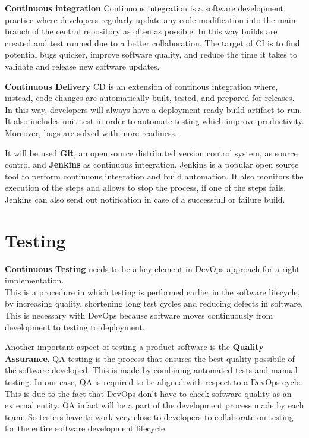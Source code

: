 \textbf{Continuous integration}
Continuous integration is a software development practice where developers regularly update any code modification into the main branch of the central repository as often as possible. In this way builds are created and test runned due to a better collaboration. The target of CI is to find potential bugs quicker, improve software quality, and reduce the time it takes to validate and release new software updates.
\par
\textbf{Continuous Delivery} 
CD is an extension of continous integration where, instead, code changes are automatically built, tested, and prepared for releases. In this way, developers will always have a deployment-ready build artifact to run. It also includes unit test in order to automate testing which improve productivity. Moreover, bugs are solved with more readiness.
\par

It will be used \textbf{Git}, an open source distributed version control system, as source control and \textbf{Jenkins} as continuous integration.
Jenkins is a popular open source tool to perform continuous integration and build automation.
It also monitors the execution of the steps and allows to stop the process, if one of the steps fails. Jenkins can also send out notification in case of a successfull or failure build.

 
\section{Testing}

\textbf{Continuous Testing} needs to be a key element in DevOps approach for a right implementation. \\
This is a procedure in which testing is performed earlier in the software lifecycle, by increasing quality, shortening long test cycles and reducing defects in software.
This is necessary with DevOps because software moves continuously from development to testing to deployment.
\par
Another important aspect of testing a product software is the \textbf{Quality Assurance}.
QA testing is the process that ensures the best quality possibile of the software developed. This is made by combining automated tests and manual testing. 
In our case, QA is required to be aligned with respect to a DevOps cycle.
This is due to the fact that DevOps don't have to check software quality as an external entity. QA infact will be a part of the development process made by each team. 
So testers have to work very close to developers to collaborate on testing for the entire software development lifecycle.














